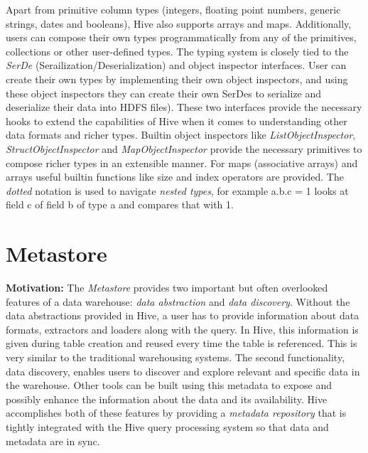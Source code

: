 \documentclass[twocolumn]{article}
\begin{document}
Apart from primitive column types (integers, floating point numbers, generic strings, dates and booleans), Hive also supports arrays and maps. Additionally, users can compose their own types programmatically from any of the primitives, collections or other user-defined types. 
The typing system is closely tied to the \textit{SerDe} (Serailization/Deserialization) and object inspector interfaces. User can create their own types by implementing their own object inspectors, and using these object inspectors they can create their own SerDes to serialize and deserialize their data into HDFS files). 
These two interfaces provide the necessary hooks to extend the capabilities of Hive when it comes to understanding other data formats and richer types. Builtin object inspectors like \textit{ListObjectInspector}, \textit{StructObjectInspector} and \textit{MapObjectInspector} provide the necessary primitives to compose richer types in an extensible manner. 
For maps (associative arrays) and arrays useful builtin functions like size and index operators are provided. The \textit{dotted} notation is used to navigate \textit{nested types}, for example a.b.c = 1 looks at field c of field b of type a and compares that with 1.

\section{Metastore}

\textbf{Motivation:} The \textit{Metastore} provides two important but often overlooked features of a data warehouse: 
\textit{data abstraction} and \textit{data discovery}. 
Without the data abstractions provided in Hive, a user has to provide information about data formats, extractors and loaders along with the query. In Hive, this information is given during table creation and reused every time the table is referenced. 
This is very similar to the traditional warehousing systems. The second functionality, data discovery, enables users to discover and explore relevant and specific data in the warehouse. Other tools can be built using this metadata to expose and possibly enhance the information about the data and its availability. 
Hive accomplishes both of these features by providing a \textit{metadata repository} that is tightly integrated with the Hive query processing system so that data and metadata are in sync.
\end{document}
